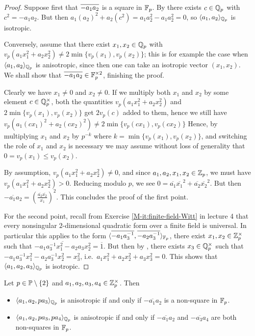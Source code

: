 \documentclass[12pt, leqno, british]{amsart}
\begin{document}
\begin{proof}
Suppose first that $\overline{-a_1a_2}$ is a square in $\mathbb F_p$. By  there exists $c \in \mathbb Q_p$ with $c^2 = -a_1a_2$.
But then $a_1(a_2)^2 + a_2(c^2) = a_1a_2^2 - a_1a_2^2 = 0$, so $\langle a_1, a_2 \rangle_{\mathbb Q_p}$ is isotropic.

Conversely, assume that there exist $x_1, x_2 \in \mathbb Q_p$ with $v_p(a_1x_1^2 + a_2x_2^2) \neq 2\min \lbrace v_p(x_1), v_p(x_2) \rbrace$; this is for example the case when $\langle a_1, a_2 \rangle_{\mathbb Q_p}$ is anisotropic, since then one can take an isotropic vector $(x_1, x_2)$.
We shall show that $\overline{-a_1a_2} \in \mathbb F_p^{\times 2}$, finishing the proof.

Clearly we have $x_1 \neq 0$ and $x_2 \neq 0$.
If we multiply both $x_1$ and $x_2$ by some element $c \in \mathbb Q_p^\times$, both the quantities $v_p(a_1x_1^2 + a_2x_2^2)$ and $2\min \lbrace v_p(x_1), v_p(x_2) \rbrace$ get $2v_p(c)$ added to them, hence we still have $v_p(a_1(cx_1)^2 + a_2(cx_2)^2) \neq 2\min \lbrace v_p(cx_1), v_p(cx_2) \rbrace$
Hence, by multiplying $x_1$ and $x_2$ by $p^{-k}$ where $k=\min \lbrace v_p(x_1), v_p(x_2) \rbrace$, and switching the role of $x_1$ and $x_2$ is necessary we may assume without loss of generality that $0 = v_p(x_1) \leq v_p(x_2)$.

By assumption, $v_p(a_1x_1^2 + a_2x_2^2) \neq 0$, and since $a_1, a_2, x_1, x_2 \in \mathbb Z_p$, we must have $v_p(a_1x_1^2 + a_2x_2^2) > 0$.
Reducing modulo $p$, we see $0 = \overline{a_1}\overline{x_1}^2 + \overline{a_2}\overline{x_2}^2$.
But then $\overline{-a_1a_2} = (\frac{\overline{a_2}\overline{x_2}}{\overline{x_1}})^2$.
This concludes the proof of the first point.

For the second point, recall from Exercise \eqref{M-it:finite-field-Witt} in lecture 4 that every nonsingular $2$-dimensional quadratic form over a finite field is universal.
In particular this applies to the form $\langle \overline{-a_1a_3^{-1}}, \overline{-a_2a_3^{-1}}\rangle_{\mathbb F_p}$, there exist $x_1, x_2 \in \mathbb Z_p^\times$ such that $\overline{-a_1a_3^{-1}x_1^2 - a_2a_3x_2^2} = \overline{1}$.
But then by , there exists $x_3 \in \mathbb Q_p^\times$ such that $-a_1a_3^{-1}x_1^2 -a_2a_3^{-1}x_2^2 = x_3^2$, i.e.~$a_1x_1^2 + a_2x_2^2 + a_3x_3^2 = 0$.
This shows that $\langle a_1, a_2, a_3 \rangle_{\mathbb Q_p}$ is isotropic.
\end{proof}
\begin{lem}\label{L:qqp-odd-4d-form}
Let $p \in \mathbb P \setminus \lbrace 2 \rbrace$ and $a_1, a_2, a_3, a_4 \in \mathbb Z_p^\times$.
Then
\begin{itemize}
\item $\langle a_1, a_2, pa_3 \rangle_{\mathbb Q_p}$ is anisotropic if and only if $\overline{-a_1a_2}$ is a non-square in $\mathbb F_p$.
\item $\langle a_1, a_2, pa_3, pa_4 \rangle_{\mathbb Q_p}$ is anisotropic if and only if $\overline{-a_1a_2}$ and $\overline{-a_3a_4}$ are both non-squares in $\mathbb F_p$.
\end{itemize}
\end{lem}
\end{document}
